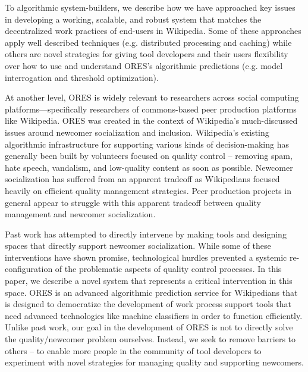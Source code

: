 To algorithmic system-builders, we describe how we have approached key issues in developing a working, scalable, and robust system that matches the decentralized work practices of end-users in Wikipedia.  Some of these approaches apply well described techniques (e.g. distributed processing and caching) while others are novel strategies for giving tool developers and their users flexibility over how to use and understand ORES's algorithmic predictions (e.g. model interrogation and threshold optimization).

At another level, ORES is widely relevant to researchers across social computing platforms---specifically researchers of commons-based peer production platforms like Wikipedia. ORES was created in the context of Wikipedia's much-discussed issues around newcomer socialization and inclusion\cite{halfaker2013rise}. Wikipedia's existing algorithmic infrastructure for supporting various kinds of decision-making has generally been built by volunteers focused on quality control -- removing spam, hate speech, vandalism, and low-quality content as soon as possible. Newcomer socialization has suffered from an apparent tradeoff as Wikipedians focused heavily on efficient quality management strategies\cite{halfaker2013rise, halfaker2014snuggle}. Peer production projects in general appear to struggle with this apparent tradeoff between quality management and newcomer socialization\cite{teblunthuis2018revisiting}.

Past work has attempted to directly intervene by making tools\cite{halfaker2014snuggle} and designing spaces\cite{morgan2013tea} that directly support newcomer socialization.  While some of these interventions have shown promise\cite{morgan2018evaluating}, technological hurdles prevented a systemic re-configuration of the problematic aspects of quality control processes\cite{halfaker2014snuggle}. In this paper, we describe a novel system that represents a critical intervention in this space.  ORES is an advanced algorithmic prediction service for Wikipedians that is designed to democratize the development of work process support tools that need advanced technologies like machine classifiers in order to function efficiently. Unlike past work, our goal in the development of ORES is not to directly solve the quality/newcomer problem ourselves.  Instead, we seek to remove barriers to others -- to enable more people in the community of tool developers to experiment with novel strategies for managing quality and supporting newcomers.

